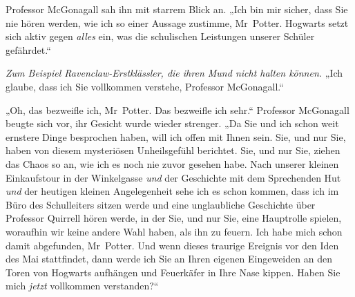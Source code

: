 Professor McGonagall sah ihn mit starrem Blick an.
„Ich bin mir sicher, dass Sie nie hören werden, wie ich so einer Aussage zustimme, Mr~Potter. Hogwarts setzt sich aktiv gegen \emph{alles} ein, was die schulischen Leistungen unserer Schüler gefährdet.“

\emph{Zum Beispiel Ravenclaw-Erstklässler, die ihren Mund nicht halten können.}
„Ich glaube, dass ich Sie vollkommen verstehe, Professor McGonagall.“

„Oh, das bezweifle ich, Mr~Potter. Das bezweifle ich sehr.“ Professor McGonagall beugte sich vor, ihr Gesicht wurde wieder strenger.
„Da Sie und ich schon weit ernstere Dinge besprochen haben, will ich offen mit Ihnen sein. Sie, und nur Sie, haben von diesem mysteriösen Unheilsgefühl berichtet. Sie, und nur Sie, ziehen das Chaos so an, wie ich es noch nie zuvor gesehen habe. Nach unserer kleinen Einkaufstour in der Winkelgasse \emph{und} der Geschichte mit dem Sprechenden Hut \emph{und} der heutigen kleinen Angelegenheit sehe ich es schon kommen, dass ich im Büro des Schulleiters sitzen werde und eine unglaubliche Geschichte über Professor Quirrell hören werde, in der Sie, und nur Sie, eine Hauptrolle spielen, woraufhin wir keine andere Wahl haben, als ihn zu feuern. Ich habe mich schon damit abgefunden, Mr~Potter. Und wenn dieses traurige Ereignis vor den Iden des Mai stattfindet, dann werde ich Sie an Ihren eigenen Eingeweiden an den Toren von Hogwarts aufhängen und Feuerkäfer in Ihre Nase kippen. Haben Sie mich \emph{jetzt} vollkommen verstanden?“


